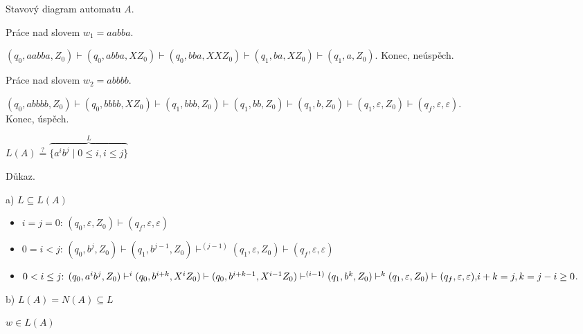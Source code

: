 \begin{multicols}{2}
    Stavový diagram automatu $A$.


    \columnbreak

    \noindent
    Práce nad slovem $w_1 = aabba$.

    \noindent
    $(q_0, aabba, Z_0) \vdash (q_0, abba, X Z_0) \vdash (q_0, bba, XXZ_0) \vdash (q_1, ba, X Z_0) \vdash (q_1, a, Z_0)$. 
    Konec, neúspěch.

    \noindent
    Práce nad slovem $w_2 = abbbb$.

    \noindent
    $(q_0, abbbb, Z_0) \vdash (q_0, bbbb, X Z_0) \vdash (q_1, bbb, Z_0) \vdash (q_1, bb, Z_0) \vdash (q_1, b, Z_0)
    \vdash (q_1, \varepsilon, Z_0) \vdash (q_f, \varepsilon, \varepsilon)$. \\Konec, úspěch.
\end{multicols}

$L(A) \stackrel{?}{=} \overbrace{\{a^i b^j \mid 0 \leq i, i \leq j\}}^L$

Důkaz.

a) $L \subseteq L(A)$
\begin{itemize}[leftmargin=*]
    \item $i=j=0 \text{: } (q_0, \varepsilon, Z_0) \vdash (q_f, \varepsilon, \varepsilon)$
    \item $0=i < j \text{: } (q_0, b^j, Z_0) \vdash (q_1, b^{j-1}, Z_0) \vdash^{(j-1)} (q_1, \varepsilon, Z_0) 
    \vdash (q_f, \varepsilon, \varepsilon)$
    \item ${0<i \leq j \text{: } (q_0, a^i b^j, Z_0) \vdash^i (q_0, b^{i+k}, X^i Z_0) \vdash (q_0, b^{i+k-1}, X^{i-1} Z_0)
    \vdash^{(i-1)} (q_1, b^k, Z_0) \vdash^k (q_1, \varepsilon, Z_0) \vdash (q_f, \varepsilon, \varepsilon),}\\
    i+k = j, k=j-i \geq 0$.
\end{itemize}

b) $L(A) = N(A) \subseteq L$

$w \in L(A)$
